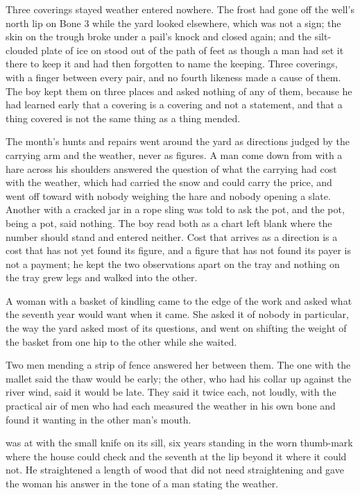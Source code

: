Three coverings stayed weather entered nowhere. The frost had gone off the well's north lip on Bone 3 while the yard looked elsewhere, which was not a sign; the skin on the trough broke under a pail's knock and closed again; and the silt-clouded plate of ice on  stood out of the path of feet as though a man had set it there to keep it and had then forgotten to name the keeping. Three coverings, with a finger between every pair, and no fourth likeness made a cause of them. The boy kept them on three places and asked nothing of any of them, because he had learned early that a covering is a covering and not a statement, and that a thing covered is not the same thing as a thing mended.

The month's hunts and repairs went around the yard as directions judged by the carrying arm and the weather, never as figures. A man come down from  with a hare across his shoulders answered the question of what the carrying had cost with the weather, which had carried the snow and could carry the price, and went off toward  with nobody weighing the hare and nobody opening a slate. Another with a cracked jar in a rope sling was told to ask the pot, and the pot, being a pot, said nothing. The boy read both as a chart left blank where the number should stand and entered neither. Cost that arrives as a direction is a cost that has not yet found its figure, and a figure that has not found its payer is not a payment; he kept the two observations apart on the tray and nothing on the tray grew legs and walked into the other.

\scenebreak

A woman with a basket of kindling came to the edge of the work and asked what the seventh year would want when it came. She asked it of nobody in particular, the way the yard asked most of its questions, and went on shifting the weight of the basket from one hip to the other while she waited.

Two men mending a strip of fence answered her between them. The one with the mallet said the thaw would be early; the other, who had his collar up against the river wind, said it would be late. They said it twice each, not loudly, with the practical air of men who had each measured the weather in his own bone and found it wanting in the other man's mouth.

 was at  with the small knife on its sill, six years standing in the worn thumb-mark where the house could check and the seventh at the lip beyond it where it could not. He straightened a length of wood that did not need straightening and gave the woman his answer in the tone of a man stating the weather.

